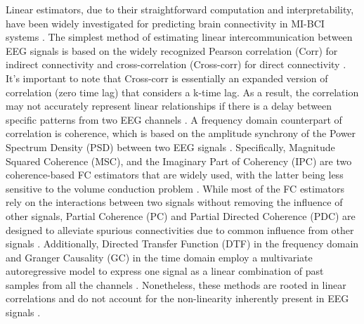 Linear estimators, due to their straightforward computation and interpretability, have been widely investigated for predicting brain connectivity in MI-BCI systems \cite{gonzalez2020network, van2015opportunities}. The simplest method of estimating linear intercommunication between EEG signals is based on the widely recognized Pearson correlation (Corr) for indirect connectivity and cross-correlation (Cross-corr) for direct connectivity \cite{fagerholm2020dynamic}. It's important to note that Cross-corr is essentially an expanded version of correlation (zero time lag) that considers a k-time lag. As a result, the correlation may not accurately represent linear relationships if there is a delay between specific patterns from two EEG channels \cite{roy2022comparative}. A frequency domain counterpart of correlation is coherence, which is based on the amplitude synchrony of the Power Spectrum Density (PSD) between two EEG signals \cite{cattai2021phase}. Specifically, Magnitude Squared Coherence (MSC), and the Imaginary Part of Coherency (IPC) are two coherence-based FC estimators that are widely used, with the latter being less sensitive to the volume conduction problem \cite{cao2022brain}. While most of the FC estimators rely on the interactions between two signals without removing the influence of other signals, Partial Coherence (PC) and Partial Directed Coherence (PDC) are designed to alleviate spurious connectivities due to common influence from other signals \cite{gonzalez2020network}. Additionally, Directed Transfer Function (DTF) in the frequency domain and Granger Causality (GC) in the time domain employ a multivariate autoregressive model to express one signal as a linear combination of past samples from all the channels \cite{rezaei2023classification}. Nonetheless, these methods are rooted in linear correlations and do not account for the non-linearity inherently present in EEG signals \cite{cao2022effective, mirzaei2021eeg}.

